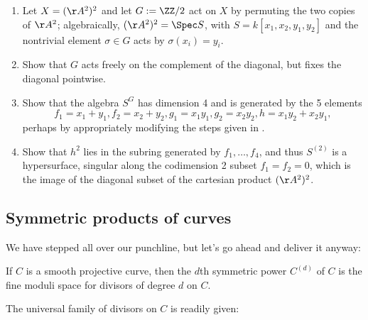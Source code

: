 \begin{exercise}
 \label{sym2A2} 
 \begin{enumerate}
 \item Let $X = (\AA^{2})^{2}$ and let $G := \ZZ/2$ act on $X$ by permuting the two copies of  $\AA^{2}$; algebraically,
$(\AA^{2})^{2} = \Spec S$, with $S = k[x_{1},x_{2}, y_{1}, y_{2}]$ and the nontrivial element $\sigma\in G$ acts by
$\sigma(x_{i}) = y_{i}$. 
\item Show that $G$ acts freely on the complement of the diagonal, but fixes the diagonal pointwise.
\item Show that the algebra $S^{G}$ has dimension 4 and is generated by the 5 elements
$$ 
f_{1} = x_{1}+y_{1}, f_{2} = x_{2}+y_{2}, g_{1} = x_{1}y_{1}, g_{2} = x_{2}y_{2}, h = x_{1}y_{2}+x_{2}y_{1},
$$
perhaps by appropriately modifying the steps given in \cite[Exercise 1.6]{E}. 
\item Show that $h^2$ lies in the subring generated by $f_1,\dots, f_4$, and thus $S^{(2)}$ is a hypersurface, singular
along the  codimension 2 subset $f_{1} = f_{2} = 0$, which is the image of the diagonal subset of the 
cartesian product $(\AA^{2})^{2}$.
\end{enumerate}
\end{exercise}



\subsection{Symmetric products of curves}

We have stepped all over our punchline, but let's go ahead and deliver it anyway:
\begin{fact}
If $C$ is a smooth projective curve, then the $d$th symmetric power $C^{(d)}$ of $C$ is the fine moduli space for divisors of degree $d$ on $C$.
\end{fact}

The universal family of divisors on $C$ is readily given:

%
%
 
